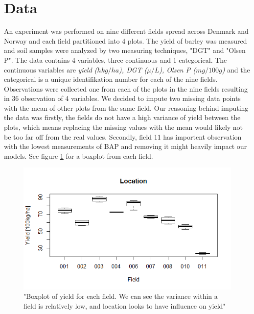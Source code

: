 \documentclass{article}
\begin{document}
\section{Data}
An experiment was performed on nine different fields spread across Denmark and Norway and each field partitioned into 4 plots. The yield of barley was measured and soil samples were analyzed by two measuring techniques, "DGT" and "Olsen P".
The data contains 4 variables, three continuous and 1 categorical. The continuous variables are \textit{yield ($hkg/ha$), DGT ($\mu/L$), Olsen P ($mg/100g$)} and the categorical is a unique identifikation number for each of the nine fields.
Observations were collected one from each of the plots in the nine fields resulting in 36 observation of 4 variables.
We decided to impute two missing data points with the mean of other plots from the same field.
Our reasoning behind imputing the data was firstly, the fields do not have a high variance of yield between the plots, which means replacing the missing values with the mean would likely not be too far off from the real values.
Secondly, field 11 has importent observation with the lowest measurements of BAP and removing it might heavily impact our models. See figure \ref{fig:loc} for a boxplot from each field.
 
\begin{figure}[H]
\includegraphics[width=\linewidth]{locationYield.png}
\caption{"Boxplot of yield for each field. We can see the variance within a field is relatively low, and location looks to have influence on yield"}
\label{fig:loc}
\end{figure}
\end{document}
